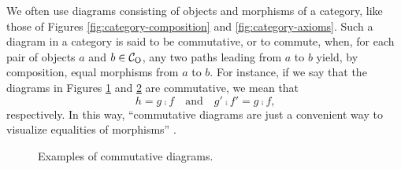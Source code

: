 \begin{definition}
  \label{def:commutative-diagram}



  We often use diagrams consisting of objects and morphisms of a
  category, like those of Figures \ref{fig:category-composition} and
  \ref{fig:category-axioms}. Such a diagram in a category  is
  said to be commutative, or to commute, when, for each pair of
  objects $a$ and $b \in \mathcal{C}_{\operatorname{O}}$, any two paths leading from $a$ to
  $b$ yield, by composition, equal morphisms from $a$ to $b$. For
  instance, if we say that the diagrams in Figures
  \ref{fig:commutative-triangle} and \ref{fig:commutative-square} are
  commutative, we mean that
  \begin{equation*}
    h = g \comp f
    \quad
    \text{and}
    \quad
    g' \comp f' = g \comp f
    \text{,}
  \end{equation*}
  respectively. In this way, ``commutative diagrams are just a
  convenient way to visualize equalities of morphisms''
  \parencite[434]{poigne-1992}.

  \begin{figure}[htbp]
    \begin{subfigure}{0.5\linewidth}
      \begin{center}
      \end{center}
      \caption{}
      \label{fig:commutative-triangle}
    \end{subfigure}
    \begin{subfigure}{0.5\linewidth}
      \begin{center}
      \end{center}
      \caption{}
      \label{fig:commutative-square}
    \end{subfigure}
    \caption{Examples of commutative diagrams.}
    \label{fig:commutative-diagram}
  \end{figure}

\end{definition}

